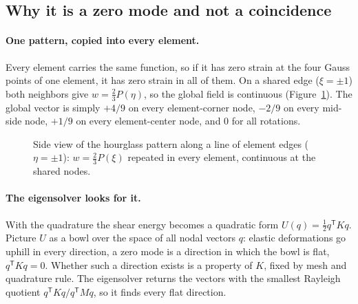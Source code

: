 \subsection{Why it is a zero mode and not a coincidence}
\paragraph{One pattern, copied into every element.} Every element carries the same
function, so if it has zero strain at the four Gauss points of one element, it has
zero strain in all of them. On a shared edge ($\xi = \pm 1$) both neighbors give
$w = \tfrac23 P(\eta)$, so the global field is continuous (Figure~\ref{fig:side_view}).
The global vector is simply $+4/9$ on every element-corner node, $-2/9$ on every
mid-side node, $+1/9$ on every element-center node, and $0$ for all rotations.

\begin{figure}[htbp]
\centering
{}
\caption{Side view of the hourglass pattern along a line of element edges
($\eta = \pm 1$): $w = \frac23 P(\xi)$ repeated in every element, continuous at the
shared nodes.}
\label{fig:side_view}
\end{figure}

\paragraph{The eigensolver looks for it.} With the quadrature the shear energy
becomes a quadratic form $U(q) = \frac12 q^\mathsf{T} K q$. Picture $U$ as a bowl over
the space of all nodal vectors $q$: elastic deformations go uphill in every direction,
a zero mode is a direction in which the bowl is flat, $q^\mathsf{T} K q = 0$. Whether
such a direction exists is a property of $K$, fixed by mesh and quadrature rule. The
eigensolver returns the vectors with the smallest Rayleigh quotient
$q^\mathsf{T} K q / q^\mathsf{T} M q$, so it finds every flat direction.

